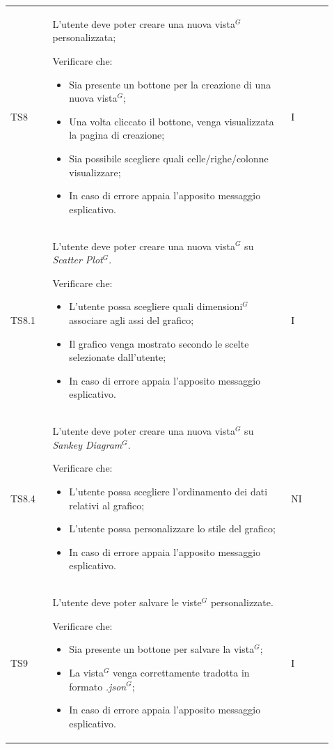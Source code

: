 \begin{longtable}{p{0.12\linewidth}p{0.68\linewidth}p{0.12\linewidth}}
    \rowcolor[RGB]{216, 235, 171}
    TS8 &
    L'utente deve poter creare una nuova vista$^{G}$ personalizzata; \par
    Verificare che:
    \begin{itemize}
        \item Sia presente un bottone per la creazione di una nuova vista$^{G}$;
        \item Una volta cliccato il bottone, venga visualizzata la pagina di creazione;
        \item Sia possibile scegliere quali celle/righe/colonne visualizzare;
        \item In caso di errore appaia l’apposito messaggio esplicativo.
    \end{itemize}&
    I \\

    \rowcolor[RGB]{233, 245, 206}
    TS8.1 &
    L'utente deve poter creare una nuova vista$^{G}$ su \textit{Scatter Plot}$^{G}$. \par
    Verificare che:
    \begin{itemize}
        \item L'utente possa scegliere quali dimensioni$^{G}$ associare agli assi del grafico;
        \item Il grafico venga mostrato secondo le scelte selezionate dall'utente;
        \item In caso di errore appaia l’apposito messaggio esplicativo.
    \end{itemize}&
    I \\

    \rowcolor[RGB]{216, 235, 171}
    TS8.4 &
    L'utente deve poter creare una nuova vista$^{G}$ su \textit{Sankey Diagram}$^{G}$. \par
    Verificare che:
    \begin{itemize}
        \item L'utente possa scegliere l'ordinamento dei dati relativi al grafico;
        \item L'utente possa personalizzare lo stile del grafico;
        \item In caso di errore appaia l'apposito messaggio esplicativo.
    \end{itemize}&
    NI \\

    \rowcolor[RGB]{233, 245, 206}
    TS9 &
    L'utente deve poter salvare le viste$^{G}$ personalizzate. \par
    Verificare che:
    \begin{itemize}
        \item Sia presente un bottone per salvare la vista$^{G}$;
        \item La vista$^{G}$ venga correttamente tradotta in formato \textit{.json}$^{G}$;
        \item In caso di errore appaia l'apposito messaggio esplicativo.
    \end{itemize}&
    I \\


\end{longtable}
